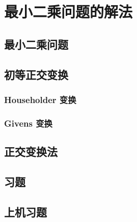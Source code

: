 \chapter{最小二乘问题的解法}

\section{最小二乘问题}

\pending

\section{初等正交变换}

\subsection{Householder 变换}

\pending

\subsection{Givens 变换}

\pending

\section{正交变换法}

\pending

\section{习题}

\pending

\section{上机习题}

\pending
